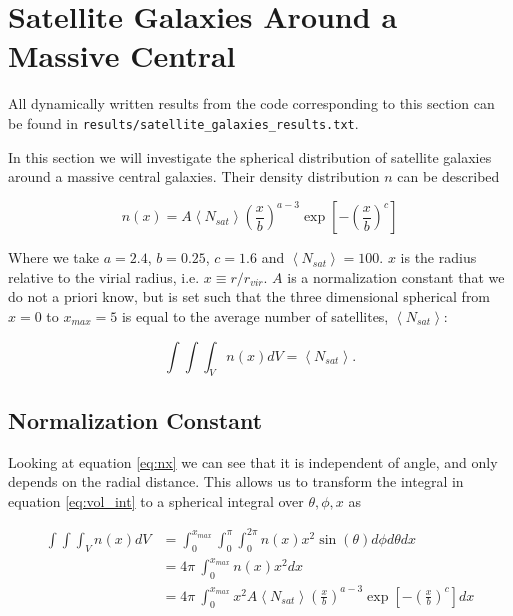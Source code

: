 \section{Satellite Galaxies Around a Massive Central}




All dynamically written results from the code corresponding to this section can be found in \texttt{results/satellite\_galaxies\_results.txt}.

In this section we will investigate the spherical distribution of satellite galaxies around a massive central galaxies. Their density distribution $n$ can be described

\begin{equation}
    n(x) = A\left<N_{sat}\right>\left(\frac{x}{b}\right)^{a-3}\exp{\left[-\left(\frac{x}{b}\right)^{c}\right]}\label{eq:nx}
\end{equation}

Where we take $a = 2.4$, $b = 0.25$, $c = 1.6$ and $\left<N_{sat}\right> = 100$. $x$ is the radius relative to the virial radius, i.e. $x \equiv r/r_{vir}$. $A$ is a normalization constant that we do not a priori know, but is set such that the three dimensional spherical from $x = 0$ to $x_{max} = 5$ is equal to the average number of satellites, $\left<N_{sat}\right>$:

\begin{equation}
    \int\int\int_V n(x)dV = \left<N_{sat}\right>.\label{eq:vol_int}
\end{equation}



\subsection{Normalization Constant}

Looking at equation \ref{eq:nx} we can see that it is independent of angle, and only depends on the radial distance. This allows us to transform the integral in equation \ref{eq:vol_int} to a spherical integral over $\theta, \phi, x$ as

\begin{align*}
    \int\int\int_V n(x)dV &= \int_0^{x_{max}} \int_0^{\pi} \int_0^{2\pi} n(x)x^2\sin(\theta) d\phi d\theta dx \\
& = 4\pi~\int_0^{x_{max}} n(x)x^2 dx \\
&= 4\pi~\int_0^{x_{max}} x^2 A\left<N_{sat}\right>\left(\frac{x}{b}\right)^{a-3}\exp{\left[-\left(\frac{x}{b}\right)^{c}\right]} dx
\end{align*}

